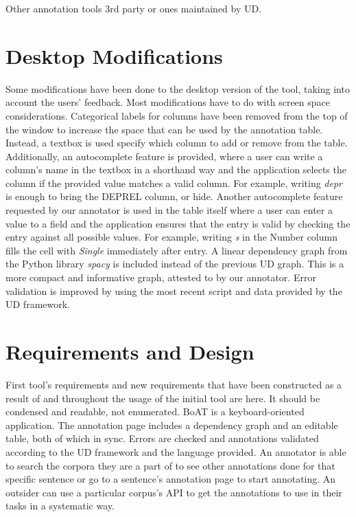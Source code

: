 \documentclass[
]{ceurart}
\begin{document}
Other annotation tools 3rd party or ones maintained by UD.

\section{Desktop Modifications}

Some modifications have been done to the desktop version of the tool, taking into account the users' feedback. Most modifications have to do with screen space considerations.
Categorical labels for columns have been removed from the top of the window to increase the space that can be used by the annotation table. Instead, a textbox is used specify which column to add or remove from the table. Additionally, an autocomplete feature is provided, where a user can write a column's name in the textbox in a shorthand way and the application selects the column if the provided value matches a valid column. For example, writing \textit{depr} is enough to bring the DEPREL column, or hide.
Another autocomplete feature requested by our annotator is used in the table itself where a user can enter a value to a field and the application ensures that the entry is valid by checking the entry against all possible values. For example, writing \textit{s} in the Number column fills the cell with \textit{Single} immediately after entry.
A linear dependency graph from the Python library \textit{spacy} is included instead of the previous UD graph. This is a more compact and informative graph, attested to by our annotator.
Error validation is improved by using the most recent script and data provided by the UD framework.

\section{Requirements and Design}

First tool's requirements and new requirements that have been constructed as a result of and throughout the usage of the initial tool are here. It should be condensed and readable, not enumerated.
BoAT is a keyboard-oriented application. The annotation page includes a dependency graph and an editable table, both of which in sync. Errors are checked and annotations validated according to the UD framework and the language provided.
An annotator is able to search the corpora they are a part of to see other annotations done for that specific sentence or go to a sentence's annotation page to start annotating.
An outsider can use a particular corpus's API to get the annotations to use in their tasks in a systematic way.
\end{document}
